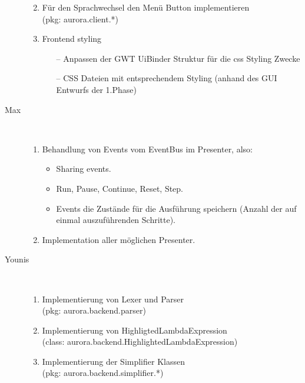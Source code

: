 \documentclass[parskip=full,11pt,twoside]{scrartcl}
\begin{document}
\begin{description}
\begin{enumerate}
\begin{itemize}
    \end{itemize}

    \item Für den Sprachwechsel den Menü Button implementieren \\(pkg: aurora.client.*)

    \item Frontend styling

    \begin{itemize}

	\item[--] Anpassen der GWT UiBinder Struktur für die css Styling Zwecke

	\item[--] CSS Dateien mit entsprechendem Styling (anhand des GUI Entwurfs der 1.Phase)

    \end{itemize}

    \end{enumerate}
	
	\newpage
	
    \item [Max]\hfill \\
    	\begin{enumerate}
        	\item Behandlung von Events vom EventBus im Presenter, also:
            \begin{itemize}
            	\item Sharing events.
                \item Run, Pause, Continue, Reset, Step.
                \item Events die Zustände für die Ausführung speichern (Anzahl der auf einmal auszuführenden Schritte).
            \end{itemize}
            \item Implementation aller möglichen Presenter.
        \end{enumerate}
    \item [Younis]\hfill \\
	\begin{enumerate}
		\item Implementierung von Lexer und Parser \\(pkg: aurora.backend.parser)
		\item Implementierung von HighligtedLambdaExpression \\(class: aurora.backend.HighlightedLambdaExpression)
		\item Implementierung der Simplifier Klassen \\(pkg: aurora.backend.simplifier.*)
	\end{enumerate}


\end{description}
\end{document}
